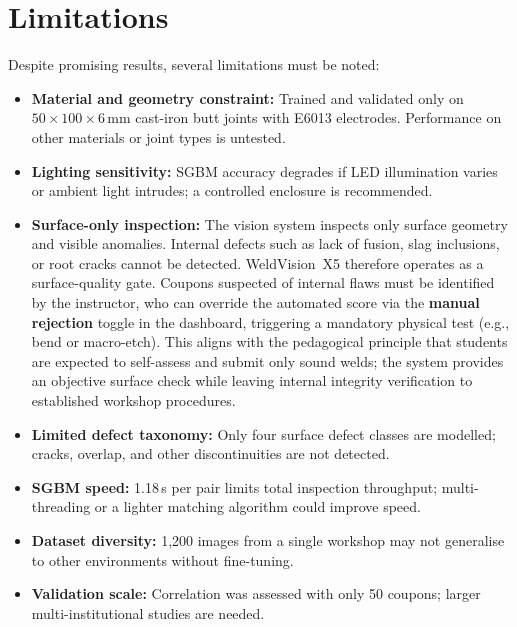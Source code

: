 \documentclass[12pt,a4paper]{article}
\begin{document}
\section{Limitations}

Despite promising results, several limitations must be noted:

\begin{itemize}[leftmargin=*, itemsep=4pt]
  \item \textbf{Material and geometry constraint:} Trained and validated only on $50\times100\times6$\,mm
        cast-iron butt joints with E6013 electrodes. Performance on other materials or joint types is
        untested.
  \item \textbf{Lighting sensitivity:} SGBM accuracy degrades if LED illumination varies or ambient light
        intrudes; a controlled enclosure is recommended.
  \item \textbf{Surface-only inspection:} The vision system inspects only surface geometry and visible
        anomalies. Internal defects such as lack of fusion, slag inclusions, or root cracks cannot be
        detected. WeldVision~X5 therefore operates as a surface-quality gate. Coupons suspected of internal
        flaws must be identified by the instructor, who can override the automated score via the
        \textbf{manual rejection} toggle in the dashboard, triggering a mandatory physical test (e.g., bend
        or macro-etch). This aligns with the pedagogical principle that students are expected to self-assess
        and submit only sound welds; the system provides an objective surface check while leaving internal
        integrity verification to established workshop procedures.
  \item \textbf{Limited defect taxonomy:} Only four surface defect classes are modelled; cracks, overlap, and
        other discontinuities are not detected.
  \item \textbf{SGBM speed:} 1.18\,s per pair limits total inspection throughput; multi-threading or a
        lighter matching algorithm could improve speed.
  \item \textbf{Dataset diversity:} 1{,}200 images from a single workshop may not generalise to other
        environments without fine-tuning.
  \item \textbf{Validation scale:} Correlation was assessed with only 50 coupons; larger multi-institutional
        studies are needed.
\end{itemize}
\end{document}
